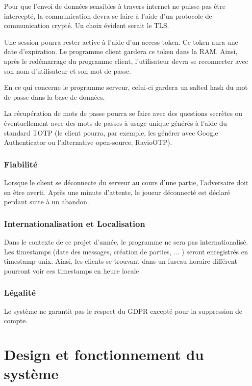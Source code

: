 \documentclass[french, utf8]{article}
\begin{document}
Pour que l'envoi de données sensibles à travers internet ne puisse pas être intercepté, la communication devra se faire à l'aide d'un protocole de communication crypté. Un choix évident serait le TLS.

Une session pourra rester active à l'aide d'un access token.
Ce token aura une date d'expiration. Le programme client gardera ce token dans la RAM.
Ainsi, après le redémarrage du programme client, l'utilisateur devra se reconnecter avec son nom d'utilisateur et son mot de passe.


En ce qui concerne le programme serveur, celui-ci gardera un salted hash du mot de passe dans la base de données.

La récupération de mots de passe pourra se faire avec des questions secrètes ou éventuellement avec des mots de passes à usage unique générés à l'aide du standard TOTP (le client pourra, par exemple, les générer avec Google Authenticator ou l'alternative open-source, RavioOTP).


\subsubsection{Fiabilité}

Lorsque le client se déconnecte du serveur au cours d'une partie, l'adversaire doit en être averti.
Après une minute d'attente, le joueur déconnecté est déclaré perdant suite à un abandon.

\subsubsection{Internationalisation et Localisation}

Dans le contexte de ce projet d'année, le programme ne sera pas internationalisé.
Les timestamps (date des messages, création de parties, ... ) seront enregistrés en timestamp unix. Ainsi, les clients se trouvant dans un fuseau horaire différent pourront voir ces timestamps en heure locale


\subsubsection{Légalité}
Le système ne garantit pas le respect du GDPR excepté pour la suppression de compte.


\section{Design et fonctionnement du système}
\end{document}

